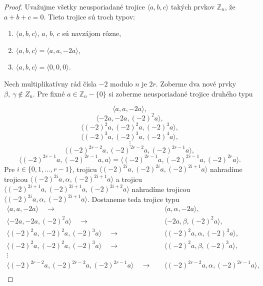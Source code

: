 \begin{proof}
	Uvažujme všetky neusporiadané trojice $\langle a, b, c \rangle$ takých prvkov $\mathbb{Z}_n$, že $a + b + c = 0$. Tieto trojice sú troch typov:
	\begin{enumerate}
		\item $\langle a, b, c \rangle$, $a$, $b$, $c$ sú navzájom rôzne,
		\item $\langle a, b, c \rangle = \langle a, a, -2a \rangle$,
		\item $\langle a, b, c \rangle = \langle 0, 0, 0 \rangle$.
	\end{enumerate}
	Nech multiplikatívny rád čísla $-2$ modulo $n$ je $2r$. Zoberme dva nové prvky $\beta,\ \gamma \notin Z_n$. Pre fixné $a \in \mathbb{Z}_n - \{0\}$ si zoberme neusporiadané trojice druhého typu
	
	$$\langle              a,              a,  -2          a \rangle,$$
	$$\langle  -2          a,  -2          a, (-2)^2       a \rangle,$$
	$$\langle (-2)^2       a, (-2)^2       a, (-2)^3       a \rangle,$$
	$$\langle (-2)^3       a, (-2)^3       a, (-2)^4       a \rangle,$$
	$$\vdots$$
	$$\langle (-2)^{2r - 2}a, (-2)^{2r - 2}a, (-2)^{2r - 1}a \rangle,$$
	$$\langle (-2)^{2r - 1}a, (-2)^{2r - 1}a,              a \rangle = \langle (-2)^{2r - 1}a, (-2)^{2r - 1}a, (-2)^{2r}a \rangle.$$
	Pre $i \in \{0, 1, \dots, r-1\}$, trojicu $\langle (-2)^{2i}a, (-2)^{2i}a, (-2)^{2i + 1}a \rangle$ nahradíme trojicou $\langle (-2)^{2i}a, \alpha, (-2)^{2i + 1}a \rangle$ a trojicu $\langle (-2)^{2i + 1}a, (-2)^{2i + 1}a, (-2)^{2i + 2}a \rangle$ nahradíme trojicou $\langle (-2)^{2i}a, \alpha, (-2)^{2i + 1}a \rangle$. Dostaneme teda trojice typu
	\begin{align*}
	\langle              a,              a,  -2          a \rangle \quad \rightarrow& \quad \langle              a,         \alpha,  -2          a \rangle,\\
	\langle  -2          a,  -2          a, (-2)^2       a \rangle \quad \rightarrow& \quad \langle  -2          a,          \beta, (-2)^2       a \rangle,\\
	\langle (-2)^2       a, (-2)^2       a, (-2)^3       a \rangle \quad \rightarrow& \quad \langle (-2)^2       a,         \alpha, (-2)^3       a \rangle,\\
	\langle (-2)^2       a, (-2)^2       a, (-2)^3       a \rangle \quad \rightarrow& \quad \langle (-2)^2       a,          \beta, (-2)^3       a \rangle,\\
	\vdots&\\
	\langle (-2)^{2r - 2}a, (-2)^{2r - 2}a, (-2)^{2r - 1}a \rangle \quad \rightarrow& \quad \langle (-2)^{2r - 2}a,         \alpha, (-2)^{2r - 1}a \rangle,\\

\end{align*}
\end{proof}
